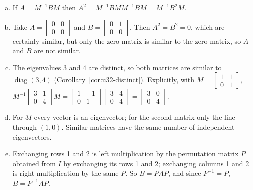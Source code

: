 \begin{solution}
\begin{enumerate}[(a)]
  \item If $A=M^{-1}BM$ then $A^2=M^{-1}BMM^{-1}BM=M^{-1}B^2M$.
  \item Take $A=\left[\begin{smallmatrix}0&0\\0&0\end{smallmatrix}\right]$ and
        $B=\left[\begin{smallmatrix}0&1\\0&0\end{smallmatrix}\right]$. Then $A^2=B^2=0$, which are
        certainly similar, but only the zero matrix is similar to the zero matrix, so $A$ and $B$
        are not similar.
  \item The eigenvalues $3$ and $4$ are distinct, so both matrices are similar to
        $\operatorname{diag}(3,4)$ (Corollary~\ref{cor:u32-distinct}). Explicitly, with
        $M=\left[\begin{smallmatrix}1&1\\0&1\end{smallmatrix}\right]$,
        $M^{-1}\left[\begin{smallmatrix}3&1\\0&4\end{smallmatrix}\right]M
        =\left[\begin{smallmatrix}1&-1\\0&1\end{smallmatrix}\right]\left[\begin{smallmatrix}3&4\\0&4\end{smallmatrix}\right]
        =\left[\begin{smallmatrix}3&0\\0&4\end{smallmatrix}\right]$.
  \item For $3I$ every vector is an eigenvector; for the second matrix only the line through
        $(1,0)$. Similar matrices have the same number of independent eigenvectors.
  \item Exchanging rows 1 and 2 is left multiplication by the permutation matrix $P$ obtained from
        $I$ by exchanging its rows 1 and 2; exchanging columns 1 and 2 is right multiplication by
        the same $P$. So $B=PAP$, and since $P^{-1}=P$, $B=P^{-1}AP$.
\end{enumerate}
\end{solution}

